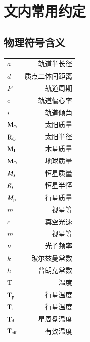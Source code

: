 
\chapter{文内常用约定} \label{apdx:nomenclature}
\section{物理符号含义} \label{apdx:symbol}
\begin{multicols}{2}
\begin{tabularx}{1.0\linewidth}{@{\extracolsep{\fill}}lr}
\centering
$a$      	     			&     轨道半长径 		\\
$d$      	     			&     质点二体间距离	 	\\
$P$      	     			&     轨道周期	 		\\
$e$      	     			&     轨道偏心率 		\\
$i$          	     			&     轨道倾角 			\\
$\mathrm{M}_\odot$          		&     太阳质量   			\\
$\mathrm{R}_\odot$          		&     太阳半径   			\\
$\mathrm{M}_\mathrm{J}$          		&     木星质量   			\\
$\mathrm{M}_\oplus$          	&     地球质量   			\\
$M_\mathrm{s}$          		&     恒星质量   			\\
$R_\mathrm{s}$          		&     恒星半径   			\\
$M_\mathrm{p}$         	 	&     行星质量   			\\
$m$         	 			&     视星等   			\\
$c$         	 			&     真空光速   			\\
$m$         	 			&     视星等   			\\
$\nu$         	 		&     光子频率   			\\
$k$         	 			&     玻尔兹曼常数   		\\
$h$         	 			&     普朗克常数   		\\
T		       	 		&      温度   			\\
$\mathrm{T}_\mathrm{p}$         	 	&      行星温度   		\\
$\mathrm{T}_\mathrm{s}$         	 	&      行星温度   		\\
$\mathrm{T}_\mathrm{d}$         	 	&      星周盘温度   		\\
$\mathrm{T}_\mathrm{eff}$         	 	&      有效温度   		\\


\end{tabularx}
\end{multicols}
